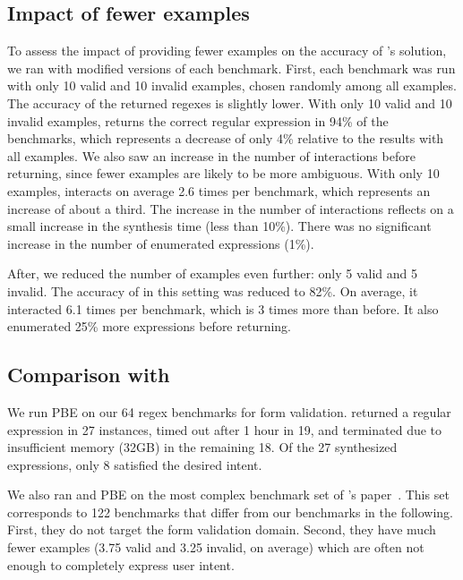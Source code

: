\subsection{Impact of fewer examples} \label{sec:fewer-exs}
To assess the impact of providing fewer examples on the accuracy of \Forest{}'s solution, we ran \Forest{} with modified versions of each benchmark.
First, each benchmark was run with only 10 valid and 10 invalid examples, chosen randomly among all examples. The accuracy of the returned regexes is slightly lower.
With only 10 valid and 10 invalid examples, \Forest{} returns the correct regular expression in 94\% of the benchmarks, which represents a decrease of only 4\% relative to the results with all examples.
We also saw an increase in the number of interactions before returning, since fewer examples are likely to be more ambiguous. With only 10 examples, \Forest{} interacts on average 2.6 times per benchmark, which represents an increase of about a third. The increase in the number of interactions reflects on a small increase in the synthesis time (less than 10\%). There was no significant increase in the number of enumerated expressions (1\%).

After, we reduced the number of examples even further: only 5 valid and 5 invalid. The accuracy of \Forest{} in this setting was reduced to 82\%. On average, it interacted 6.1 times per benchmark, which is 3 times more than before. It also enumerated 25\% more expressions before returning.


\subsection{Comparison with \Regel}\label{sec:comp-regel}
%



We run \Regel{} PBE on our 64 regex benchmarks for form validation.
%
\Regel{} returned a regular expression in 27 instances, timed out after 1 hour in 19, and terminated due to insufficient memory (32GB) in the remaining 18. Of the 27 synthesized expressions, only 8 satisfied the desired intent.

We also ran \Forest{} and \Regel{} PBE on the most complex benchmark set of \Regel's paper~\cite{Regel20}. This set corresponds to 122 benchmarks that differ from our benchmarks in the following. First, they do not target the form validation domain. Second, they have much fewer examples (3.75 valid and 3.25 invalid, on average) which are often not enough to completely express user intent. 

